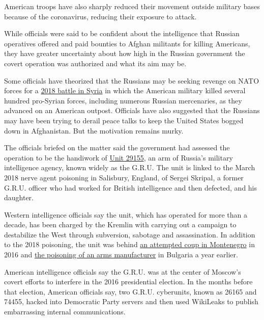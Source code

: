 American troops have also sharply reduced their movement outside
military bases because of the coronavirus, reducing their exposure to
attack.

While officials were said to be confident about the intelligence that
Russian operatives offered and paid bounties to Afghan militants for
killing Americans, they have greater uncertainty about how high in the
Russian government the covert operation was authorized and what its aim
may be.

Some officials have theorized that the Russians may be seeking revenge
on NATO forces for a
\href{https://www.nytimes.com/2018/05/24/world/middleeast/american-commandos-russian-mercenaries-syria.html}{2018
battle in Syria} in which the American military killed several hundred
pro-Syrian forces, including numerous Russian mercenaries, as they
advanced on an American outpost. Officials have also suggested that the
Russians may have been trying to derail peace talks to keep the United
States bogged down in Afghanistan. But the motivation remains murky.

The officials briefed on the matter said the government had assessed the
operation to be the handiwork of
\href{https://www.nytimes.com/2019/10/08/world/europe/unit-29155-russia-gru.html}{Unit
29155}, an arm of Russia's military intelligence agency, known widely as
the G.R.U. The unit is linked to the March 2018 nerve agent poisoning in
Salisbury, England, of Sergei Skripal, a former G.R.U. officer who had
worked for British intelligence and then defected, and his daughter.

Western intelligence officials say the unit, which has operated for more
than a decade, has been charged by the Kremlin with carrying out a
campaign to destabilize the West through subversion, sabotage and
assassination. In addition to the 2018 poisoning, the unit was behind
\href{https://www.nytimes.com/2019/05/09/world/europe/montenegro-coup-plot-gru.html}{an
attempted coup in Montenegro} in 2016 and
\href{https://www.nytimes.com/2019/12/22/world/europe/bulgaria-russia-assassination-squad.html}{the
poisoning of an arms manufacturer} in Bulgaria a year earlier.

American intelligence officials say the G.R.U. was at the center of
Moscow's covert efforts to interfere in the 2016 presidential election.
In the months before that election, American officials say, two G.R.U.
cyberunits, known as 26165 and 74455, hacked into Democratic Party
servers and then used WikiLeaks to publish embarrassing internal
communications.

